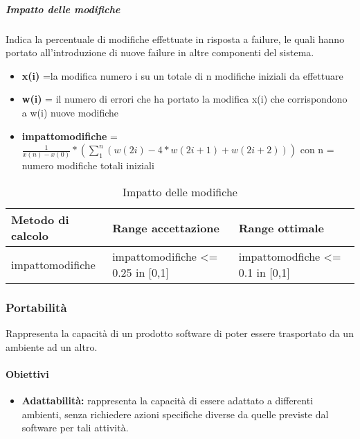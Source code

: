 			
			\subparagraph{Impatto delle modifiche}
			Indica la percentuale di modifiche effettuate in risposta a failure, le quali hanno portato all’introduzione di nuove failure in altre componenti del sistema.
			
			\begin{itemize}
				\item \textbf{x(i)} =la modifica numero i su un totale di n modifiche iniziali da effettuare
				\item \textbf{w(i)} = il numero di errori che ha portato la modifica x(i) che corrispondono a w(i) nuove modifiche
				\item \textbf{impattomodifiche} = \begin{math}
				\frac{1}{x(n)-x(0)}*(\sum_{1}^{n}(w(2i) - 4*w(2i+1) + w(2i+2))) 
				\end{math} con n = numero modifiche totali iniziali
			\end{itemize}
			
			\begin{table}[H]
				\begin{longtable}{>{\centering\arraybackslash}p{5cm}|>{\centering\arraybackslash}p{5cm} | >{\centering\arraybackslash}p{5cm}}
					\hline
					\rowcolor{Gray}
					\textbf{Metodo di calcolo} & \textbf{Range accettazione} & \textbf{Range ottimale} \\
					\hline
					impattomodifiche &impattomodifiche <= 0.25 in [0,1] & impattomodfiche <= 0.1 in [0,1]
				\end{longtable}
				\caption{Impatto delle modifiche}
			\end{table}
			
		
	
	\subsubsection{Portabilità}
	Rappresenta la capacità di un prodotto software di poter essere trasportato da un ambiente ad un altro.
		
		\paragraph{Obiettivi}
			\begin{itemize}
				\item \textbf{Adattabilità:} rappresenta la capacità di essere adattato a differenti ambienti, senza richiedere azioni specifiche diverse da quelle previste dal software per tali attività.
			\end{itemize}
		
